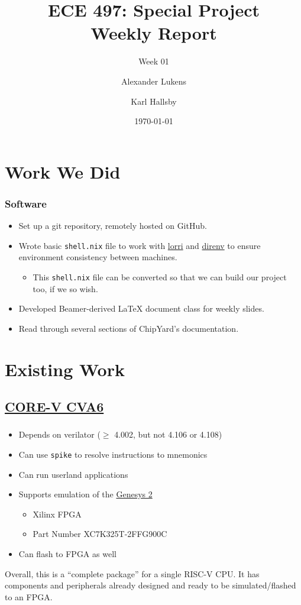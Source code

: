 \documentclass{weeklyslides}
\title[Weekly Report]{ECE 497: Special Project \\ Weekly Report}
\subtitle{Week 01}
\author{Alexander Lukens \and Karl Hallsby}
\institute{Illinois Institute of Technology}
\date{\today}
\begin{document}
\begin{frame}
  \titlepage{}
\end{frame}

\section{Work We Did}\label{sec:Work_We_Did}
\begin{frame}
  \frametitle{Software}
  \begin{itemize}
  \item Set up a git repository, remotely hosted on GitHub.
  \item Wrote basic \texttt{shell.nix} file to work with \href{https://github.com/target/lorri}{lorri} and \href{https://github.com/direnv/direnv}{direnv} to ensure environment consistency between machines.
    \begin{itemize}
    \item This \texttt{shell.nix} file can be converted so that
      we can build our project too, if we so wish.
    \end{itemize}
  \item Developed Beamer-derived \LaTeX{} document class for weekly slides.
  \item Read through several sections of ChipYard's documentation.
  \end{itemize}
\end{frame}

\section{Existing Work}\label{sec:Existing_Work}
\subsection{\href{https://github.com/openhwgroup/cva6}{CORE-V CVA6}}\label{sec:CORE_V_CVA6}
\begin{frame}
  \frametitle{}
  \begin{itemize}
  \item Depends on verilator ($\geq$ 4.002, but not 4.106 or 4.108)
  \item Can use \texttt{spike} to resolve instructions to mnemonics
  \item Can run userland applications
  \item Supports emulation of the \href{https://reference.digilentinc.com/reference/programmable-logic/genesys-2/reference-manual}{Genesys 2}
    \begin{itemize}
    \item Xilinx FPGA
    \item Part Number XC7K325T-2FFG900C
    \end{itemize}
  \item Can flash to FPGA as well
  \end{itemize}

  Overall, this is a ``complete package'' for a single RISC-V CPU.\@
  It has components and peripherals already designed and ready to be simulated/flashed to an FPGA.\@
\end{frame}
\end{document}
